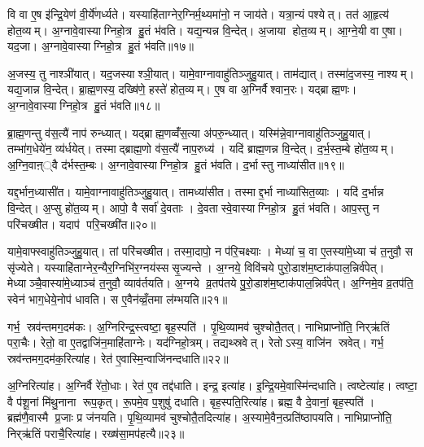 वि वा ए॒ष इ॑न्द्रि॒येण॑ वी॒र्ये॑णर्ध्यते। यस्याहि॑ताग्नेर॒ग्निर्म॒थ्यमा॑नो॒ न जाय॑ते। यत्रा॒न्यं पश्येत्। तत॑ आ॒हृत्य॑ होत॒व्यम्। अ॒ग्नावे॒वास्याग्निहो॒त्र हु॒तं भ॑वति। यद्य॒न्यन्न वि॒न्देत्। अ॒जाया होत॒व्यम्। आ॒ग्ने॒यी वा ए॒षा। यद॒जा। अ॒ग्नावे॒वास्याग्निहो॒त्र हु॒तं भ॑वति॥१७॥

अ॒जस्य॒ तु नाश्ञी॑यात्। यद॒जस्याश्ञी॒यात्। यामे॒वाग्नावाहु॑तिञ्जुहु॒यात्। ताम॑द्यात्। तस्मा॑द॒जस्य॒ नाश्यम्। यद्य॒जान्न वि॒न्देत्। ब्रा॒ह्म॒णस्य॒ दख्षि॑णे॒ हस्ते॑ होत॒व्यम्। ए॒ष वा अ॒ग्निर्वैश्वान॒रः। यद्ब्राह्म॒णः। अ॒ग्नावे॒वास्याग्निहो॒त्र हु॒तं भ॑वति॥१८॥

ब्रा॒ह्म॒णन्तु व॑स॒त्यै॑ नाप॑ रुन्ध्यात्। यद्ब्राह्म॒णव्वँ॑स॒त्या अ॑परु॒न्ध्यात्। यस्मि॑न्ने॒वाग्नावाहु॑तिञ्जुहु॒यात्। तम्भा॑ग॒धेये॑न॒ व्य॑र्धयेत्। तस्माद्ब्राह्म॒णो व॑स॒त्यै॑ नाप॒रुध्य॑। यदि॑ ब्राह्म॒णन्न वि॒न्देत्। द॒र्भ॒स्त॒म्बे हो॑त॒व्यम्। अ॒ग्नि॒वाऩ््वै द॑र्भस्त॒म्बः। अ॒ग्नावे॒वास्याग्निहो॒त्र हु॒तं भ॑वति। द॒र्भास्तु नाध्या॑सीत॥१९॥

यद्द॒र्भान॒ध्यासी॑त। यामे॒वाग्नावाहु॑तिञ्जुहु॒यात्। तामध्या॑सीत। तस्माद्द॒र्भा नाध्या॑सित॒व्याः। यदि॑ द॒र्भान्न वि॒न्देत्। अ॒प्सु हो॑त॒व्यम्। आपो॒ वै सर्वा॑ दे॒वताः। दे॒वतास्वे॒वास्याग्निहो॒त्र हु॒तं भ॑वति। आप॒स्तु न परि॑चख्षीत। यदाप॑ परि॒चख्षी॑त॥२०॥

यामे॒वाफ्स्वाहु॑तिञ्जुहु॒यात्। तां परि॑चख्षीत। तस्मा॒दापो॒ न प॑रि॒चक्ष्याः। मेध्या॑ च॒ वा ए॒तस्या॑मे॒ध्या च॑ त॒नुवौ॒ स सृ॑ज्येते। यस्याहि॑ताग्नेर॒न्यैर॒ग्निभि॑र॒ग्नय॑स्ससृ॒ज्यन्ते। अ॒ग्नये॒ विवि॑चये पुरो॒डाश॑म॒ष्टाक॑पाल॒न्निर्व॑पेत्। मेध्याञ्चै॒वास्या॑मे॒ध्याञ्च॑ त॒नुवौ॒ व्याव॑र्तयति। अ॒ग्नये व्र॒तप॑तये पु॒रो॒डाश॑म॒ष्टाक॑पाल॒न्निर्व॑पेत्। अ॒ग्निमे॒व व्र॒तप॑ति॒ स्वेन॑ भाग॒धेये॒नोप॑ धावति। स ए॒वैन॑व्व्रँ॒तमा ल॑म्भयति॥२१॥

गर्भ॒ स्रव॑न्तमग॒दम॑कः। अ॒ग्निरिन्द्र॒स्त्वष्टा॒ बृह॒स्पति॑। पृ॒थि॒व्यामव॑ चुश्चोतै॒तत्। नाभिप्राप्नो॑ति॒ निर्‌ऋ॑तिं परा॒चैः। रेतो॒ वा ए॒तद्वाजि॑न॒माहि॑ताग्नेः। यद॑ग्निहो॒त्रम्। तद्यथ्स्रवेत्। रेतोऽस्य॒ वाजि॑न स्रवेत्। गर्भ॒ स्रव॑न्तमग॒दम॑क॒रित्या॑ह। रेत॑ ए॒वास्मि॒न्वाजि॑नन्दधाति॥२२॥

अ॒ग्निरित्या॑ह। अ॒ग्निर्वै रे॑तो॒धाः। रेत॑ ए॒व तद्द॑धाति। इन्द्र॒ इत्या॑ह। इ॒न्द्रि॒यमे॒वास्मि॑न्दधाति। त्वष्टेत्या॑ह। त्वष्टा॒ वै प॑शू॒नां मि॑थु॒नाना रूप॒कृत्। रू॒पमे॒व प॒शुषु॑ दधाति। बृह॒स्पति॒रित्या॑ह। ब्रह्म॒ वै दे॒वानां॒ बृह॒स्पति॑। ब्रह्म॑णै॒वास्मै प्र॒जाः प्र ज॑नयति। पृ॒थि॒व्यामव॑ चुश्चोतै॒तदित्या॑ह। अ॒स्यामे॒वैन॒त्प्रति॑ष्ठापयति। नाभिप्राप्नो॑ति॒ निर्‌ऋ॑तिं पराचै॒रित्या॑ह। रख्ष॑सा॒मप॑हत्यै॥२३॥


